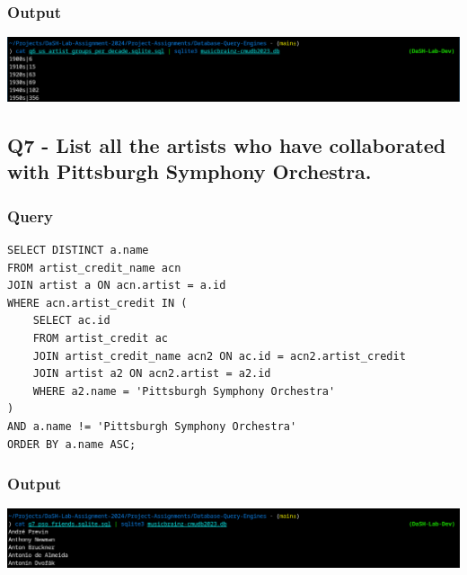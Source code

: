 \documentclass[11pt]{article}
\begin{document}
\subsubsection{Output}
\label{sec:org2c404ba}
\begin{center}
\includegraphics[width=.9\linewidth]{./images/Q6.png}
\end{center}
\subsection{Q7 - List all the artists who have collaborated with Pittsburgh Symphony Orchestra.}
\label{sec:orgf873dfc}
\subsubsection{Query}
\label{sec:orge774e28}
\begin{verbatim}
SELECT DISTINCT a.name
FROM artist_credit_name acn
JOIN artist a ON acn.artist = a.id
WHERE acn.artist_credit IN (
    SELECT ac.id
    FROM artist_credit ac
    JOIN artist_credit_name acn2 ON ac.id = acn2.artist_credit
    JOIN artist a2 ON acn2.artist = a2.id
    WHERE a2.name = 'Pittsburgh Symphony Orchestra'
)
AND a.name != 'Pittsburgh Symphony Orchestra'
ORDER BY a.name ASC;
\end{verbatim}
\subsubsection{Output}
\label{sec:org51481f2}
\begin{center}
\includegraphics[width=.9\linewidth]{./images/Q7.png}
\end{center}
\end{document}

